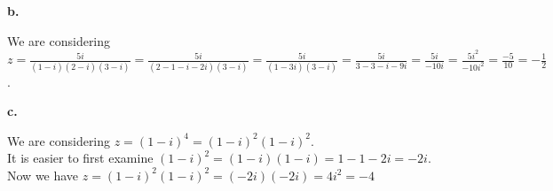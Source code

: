 \documentclass{article}
\begin{document}
{\Large\textbf{b.}}
\begin{center}
    \doublespacing
    We are considering $z =\frac{5i}{(1 - i)(2 - i)(3 - i)} =\frac{5i}{(2 - 1 - i - 2i)(3 - i)} =\frac{5i}{(1 - 3i)(3 - i)} =\frac{5i}{3 - 3 - i - 9i} =\frac{5i}{-10i} =\frac{5i^2}{-10i^2} =\frac{-5}{10} = -\frac{1}{2}$.
\end{center}

{\Large\textbf{c.}}
\begin{center}
    \doublespacing
    We are considering $z = (1 - i)^4 = (1 - i)^2 (1 - i)^2$.
    \\It is easier to first examine $(1 - i)^2 = (1 - i)(1 - i) = 1 - 1 - 2i = -2i$.
    \\Now we have $z = (1 - i)^2 (1 - i)^2 = (-2i)(-2i) = 4i^2 = -4$ \qedsymbol
\end{center}

\newpage
\end{document}
